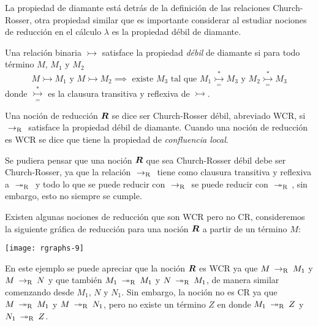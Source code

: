 La propiedad de diamante está detrás de la definición de las relaciones Church-Rosser, otra propiedad similar que es importante considerar al estudiar nociones de reducción en el cálculo \( λ \) es la propiedad débil de diamante.

\begin{defn}
  Una relación binaria \( \rightarrowtail \) satisface la propiedad \emph{débil} de diamante si para todo término \( M \), \( M_{1} \) y \( M_{2} \)
  \[ M \rightarrowtail M_{1} \text{ y } M \rightarrowtail M_{2} \implies \text{ existe } M_{3} \text{ tal que } M_{1} \underset{=}{\overset{*}{\rightarrowtail}} M_{3} \text{ y } M_{2} \underset{=}{\overset{*}{\rightarrowtail}} M_{3} \]
  donde \( \underset{=}{\overset{*}{\rightarrowtail}} \) es la clausura transitiva y reflexiva de \( \rightarrowtail \).
\end{defn}

\begin{defn}
  Una noción de reducción \( \boldsymbol{R} \) se dice ser Church-Rosser débil, abreviado WCR, si \( \ \operatorname{\rightarrow_{R}}\  \) satisface la propiedad débil de diamante. Cuando una noción de reducción es WCR se dice que tiene la propiedad de \emph{confluencia local}.
\end{defn}

Se pudiera pensar que una noción \( \boldsymbol{R} \) que sea Church-Rosser débil debe ser Church-Rosser, ya que la relación \( \ \operatorname{\rightarrow_{R}}\  \) tiene como clausura transitiva y reflexiva a \( \ \operatorname{\twoheadrightarrow_{R}}\  \) y todo lo que se puede reducir con \( \ \operatorname{\rightarrow_{R}}\  \) se puede reducir con \( \ \operatorname{\twoheadrightarrow_{R}}\  \), sin embargo, esto no siempre se cumple.

Existen algunas nociones de reducción que son WCR pero no CR, consideremos la siguiente gráfica de reducción para una noción \( \boldsymbol{R} \) a partir de un término \( M \):

\begin{center}
  \texttt{[image: rgraphs-9]}
\end{center}

En este ejemplo se puede apreciar que la noción \( \boldsymbol{R} \) es WCR ya que \( M \ \operatorname{\rightarrow_{R}}\  M_{1} \) y \( M \ \operatorname{\rightarrow_{R}}\  N \) y que también \( M_{1} \ \operatorname{\twoheadrightarrow_{R}}\  M_{1} \) y \( N \ \operatorname{\twoheadrightarrow_{R}}\  M_{1} \), de manera similar comenzando desde \( M_{1} \), \( N \) y \( N_{1} \). Sin embargo, la noción no es CR ya que \( M \ \operatorname{\twoheadrightarrow_{R}}\  M_{1} \) y \( M \ \operatorname{\twoheadrightarrow_{R}}\  N_{1} \), pero no existe un término \( Z \) en donde \( M_{1} \ \operatorname{\twoheadrightarrow_{R}}\  Z \) y \( N_{1} \ \operatorname{\twoheadrightarrow_{R}}\  Z \).


